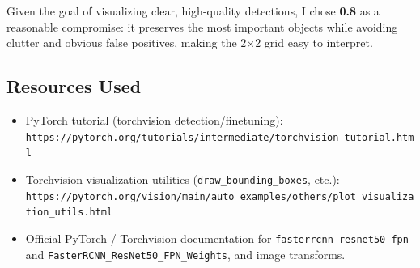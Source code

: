 \documentclass[11pt]{article}
\begin{document}
Given the goal of visualizing clear, high-quality detections, I chose \textbf{0.8} as a reasonable compromise: it preserves the most important objects while avoiding clutter and obvious false positives, making the 2$\times$2 grid easy to interpret.

\subsection{Resources Used}

\begin{itemize}
  \item PyTorch tutorial (torchvision detection/finetuning): \\
    \texttt{https://pytorch.org/tutorials/intermediate/torchvision\_tutorial.html}
  \item Torchvision visualization utilities (\texttt{draw\_bounding\_boxes}, etc.): \\
    \texttt{https://pytorch.org/vision/main/auto\_examples/others/plot\_visualization\_utils.html}
  \item Official PyTorch / Torchvision documentation for \texttt{fasterrcnn\_resnet50\_fpn} and 
  \newline \texttt{FasterRCNN\_ResNet50\_FPN\_Weights}, and image transforms.
\end{itemize}
\end{document}
